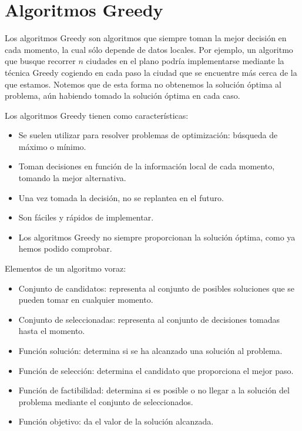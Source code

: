 \chapter{Algoritmos Greedy}
Los algoritmos Greedy son algoritmos que siempre toman la mejor decisión en cada momento, la cual sólo depende de datos locales. Por ejemplo, un algoritmo que busque recorrer $n$ ciudades en el plano podría implementarse mediante la técnica Greedy cogiendo en cada paso la ciudad que se encuentre más cerca de la que estamos. Notemos que de esta forma no obtenemos la solución óptima al problema, aún habiendo tomado la solución óptima en cada caso.

Los algoritmos Greedy tienen como características:
\begin{itemize}
    \item Se suelen utilizar para resolver problemas de optimización: búsqueda de máximo o mínimo.
    \item Toman decisiones en función de la información local de cada momento, tomando la mejor alternativa.
    \item Una vez tomada la decisión, no se replantea en el futuro.
    \item Son fáciles y rápidos de implementar.
    \item Los algoritmos Greedy no siempre proporcionan la solución óptima, como ya hemos podido comprobar.
\end{itemize}

\noindent
Elementos de un algoritmo voraz:
\begin{itemize}
    \item Conjunto de candidatos: representa al conjunto de posibles soluciones que se pueden tomar en cualquier momento.
    \item Conjunto de seleccionadas: representa al conjunto de decisiones tomadas hasta el momento.
    \item Función solución: determina si se ha alcanzado una solución al problema.
    \item Función de selección: determina el candidato que proporciona el mejor paso.
    \item Función de factibilidad: determina si es posible o no llegar a la solución del problema mediante el conjunto de seleccionados.
    \item Función objetivo: da el valor de la solución alcanzada.
\end{itemize}

